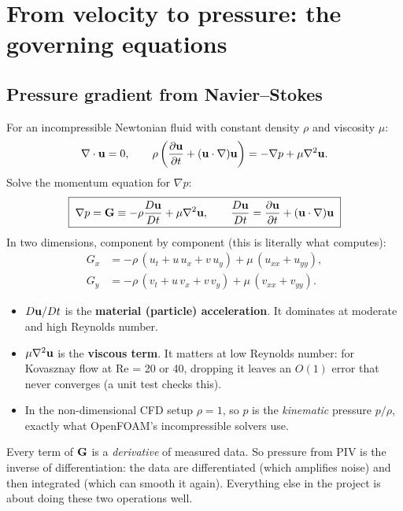 \chapter{From velocity to pressure: the governing equations}

\section{Pressure gradient from Navier--Stokes}
For an incompressible Newtonian fluid with constant density $\rho$ and viscosity $\mu$:
\begin{equation}
\nabla\cdot\mathbf{u} = 0, \qquad
\rho\left(\frac{\partial\mathbf{u}}{\partial t}+(\mathbf{u}\cdot\nabla)\mathbf{u}\right) = -\nabla p + \mu\nabla^2\mathbf{u} .
\label{eq:ns}
\end{equation}
Solve the momentum equation for $\nabla p$:
\begin{equation}
\boxed{\;\nabla p = \mathbf{G} \equiv -\rho\frac{D\mathbf{u}}{Dt}+\mu\nabla^2\mathbf{u}, \qquad \frac{D\mathbf{u}}{Dt}=\frac{\partial\mathbf{u}}{\partial t}+(\mathbf{u}\cdot\nabla)\mathbf{u}\;}
\label{eq:G}
\end{equation}
In two dimensions, component by component (this is literally what  computes):
\begin{align}
G_x &= -\rho\,(u_t + u\,u_x + v\,u_y) + \mu\,(u_{xx}+u_{yy}),\\
G_y &= -\rho\,(v_t + u\,v_x + v\,v_y) + \mu\,(v_{xx}+v_{yy}).
\end{align}
\begin{itemize}
  \item $D\mathbf{u}/Dt$ is the \textbf{material (particle) acceleration}. It dominates at moderate and high Reynolds number.
  \item $\mu\nabla^2\mathbf{u}$ is the \textbf{viscous term}. It matters at low Reynolds number: for Kovasznay flow at Re = 20 or 40, dropping it leaves an $O(1)$ error that never converges (a unit test checks this).
  \item In the non-dimensional CFD setup $\rho=1$, so $p$ is the \emph{kinematic} pressure $p/\rho$, exactly what OpenFOAM's incompressible solvers use.
\end{itemize}

\begin{keyidea}
Every term of $\mathbf{G}$ is a \emph{derivative} of measured data. So pressure from PIV is the inverse of differentiation: the data are differentiated (which amplifies noise) and then integrated (which can smooth it again). Everything else in the project is about doing these two operations well.
\end{keyidea}

